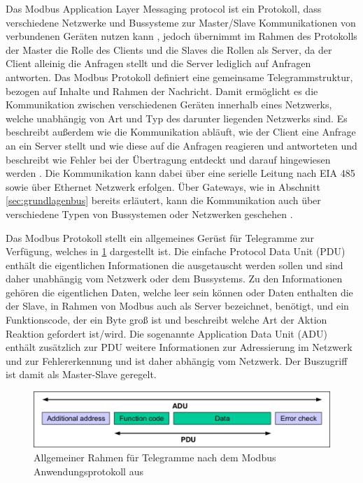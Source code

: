 Das Modbus Application Layer Messaging protocol ist ein Protokoll, dass verschiedene Netzwerke und Bussysteme zur Master/Slave Kommunikationen von verbundenen Geräten nutzen kann \cite[S.~2f.]{mod12}, jedoch übernimmt im Rahmen des Protokolls der Master die Rolle des Clients und die Slaves die Rollen als Server, da der Client alleinig die Anfragen stellt und die Server lediglich auf Anfragen antworten.
Das Modbus Protokoll definiert eine gemeinsame Telegrammstruktur, bezogen auf Inhalte und Rahmen der Nachricht. Damit ermöglicht es die Kommunikation zwischen verschiedenen Geräten innerhalb eines Netzwerks, welche unabhängig von Art und Typ des darunter liegenden Netzwerks sind. Es beschreibt außerdem wie die Kommunikation abläuft, wie der Client eine Anfrage an ein Server stellt und wie diese auf die Anfragen reagieren und antworteten und beschreibt wie Fehler bei der Übertragung entdeckt und darauf hingewiesen werden \cite[S.~2f.]{mod96}.
Die Kommunikation kann dabei über eine serielle Leitung nach EIA 485 sowie über Ethernet Netzwerk erfolgen. Über Gateways, wie in Abschnitt \ref{sec:grundlagenbus} bereits erläutert, kann die Kommunikation auch über verschiedene Typen von Bussystemen oder Netzwerken geschehen \cite[S.~3f.]{mod12}.

Das Modbus Protokoll stellt ein allgemeines Gerüst für Telegramme zur Verfügung, welches in \ref{fig:modbusframe} dargestellt ist.  Die einfache Protocol Data Unit (PDU) enthält die eigentlichen Informationen die ausgetauscht werden sollen und sind daher unabhängig vom Netzwerk oder dem Bussystems. Zu den Informationen gehören die eigentlichen Daten, welche leer sein können oder Daten enthalten die der Slave, in Rahmen von Modbus auch als Server bezeichnet, benötigt, und ein Funktionscode, der ein Byte groß ist und beschreibt welche Art der Aktion Reaktion gefordert ist/wird. Die sogenannte Application Data Unit (ADU) enthält zusätzlich zur PDU weitere Informationen zur Adressierung im Netzwerk und zur Fehlererkennung und ist daher abhängig vom Netzwerk. Der Buszugriff ist damit als Master-Slave geregelt.

\begin{figure}
\centering
\includegraphics[width=\textwidth]{abbildungen/20160319_Modbusframe}
\caption[Allgemeiner Rahmen für Telegramme nach dem Modbus Anwendungsprotokoll]{Allgemeiner Rahmen für Telegramme nach dem Modbus Anwendungsprotokoll aus \cite[S.~3]{mod12}}
\label{fig:modbusframe}
\end{figure}

